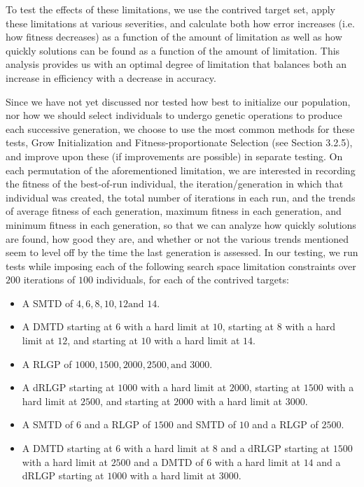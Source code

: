 \documentclass[a4paper,12pt]{report} 	%
\numberwithin{figure}{chapter}
\numberwithin{table}{chapter}
\numberwithin{equation}{chapter}
\begin{document}
\begin{flushleft}
To test the effects of these limitations, we use the contrived target set, apply these limitations at various severities, and calculate both how error increases (i.e. how fitness decreases) as a function of the amount of limitation as well as how quickly solutions can be found as a function of the amount of limitation. This analysis provides us with an optimal degree of limitation that balances both an increase in efficiency with a decrease in accuracy.

Since we have not yet discussed nor tested how best to initialize our population, nor how we should select individuals to undergo genetic operations to produce each successive generation, we choose to use the most common methods for these tests, Grow Initialization and Fitness-proportionate Selection (see Section 3.2.5), and improve upon these (if improvements are possible) in separate testing. On each permutation of the aforementioned limitation, we are interested in recording the fitness of the best-of-run individual, the iteration/generation in which that individual was created, the total number of iterations in each run, and the trends of average fitness of each generation, maximum fitness in each generation, and minimum fitness in each generation, so that we can analyze how quickly solutions are found, how good they are, and whether or not the various trends mentioned seem to level off by the time the last generation is assessed. In our testing, we run tests while imposing each of the following search space limitation constraints over $200$ iterations of $100$ individuals, for each of the contrived targets:
\begin{itemize}
\item A SMTD of $4,6,8, 10, 12 \text{and }14$.
\item A DMTD starting at $6$ with a hard limit at $10$, starting at $8$ with a hard limit at $12$, and starting at $10$ with a hard limit at $14$.
\item A RLGP of $1000, 1500, 2000, 2500, \text{and } 3000$.
\item A dRLGP starting at $1000$ with a hard limit at $2000$, starting at $1500$ with a hard limit at $2500$, and starting at $2000$ with a hard limit at $3000$.
\item A SMTD of $6$ and a RLGP of $1500$ and SMTD of $10$ and a RLGP of $2500$.
\item A DMTD starting at $6$ with a hard limit at $8$ and a dRLGP starting at $1500$ with a hard limit at $2500$ and a DMTD of $6$ with a hard limit at $14$ and a dRLGP starting at  $1000$ with a hard limit at $3000$.
\end{itemize}


\end{flushleft}
\end{document}
